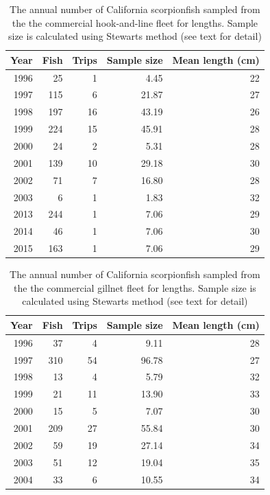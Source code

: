 \documentclass[12pt,]{article}
\begin{document}
\FloatBarrier

\vspace{2in}

\begin{table}[ht]
\centering
\caption{The annual number of California scorpionfish 
                                              sampled from the the commercial hook-and-line 
                                            fleet for lengths. Sample size is calculated 
                                            using Stewarts method (see text for detail)} 
\label{tab:ComHL_lengthsample}
\begin{tabular}{rrrrr}
  \hline
Year & Fish & Trips & Sample size & Mean length (cm) \\ 
  \hline
1996 & 25 & 1 & 4.45 & 22 \\ 
  1997 & 115 & 6 & 21.87 & 27 \\ 
  1998 & 197 & 16 & 43.19 & 26 \\ 
  1999 & 224 & 15 & 45.91 & 28 \\ 
  2000 & 24 & 2 & 5.31 & 28 \\ 
  2001 & 139 & 10 & 29.18 & 30 \\ 
  2002 & 71 & 7 & 16.80 & 28 \\ 
  2003 & 6 & 1 & 1.83 & 32 \\ 
  2013 & 244 & 1 & 7.06 & 29 \\ 
  2014 & 46 & 1 & 7.06 & 30 \\ 
  2015 & 163 & 1 & 7.06 & 29 \\ 
   \hline
\end{tabular}
\end{table}\vspace{2in}

\begin{table}[ht]
\centering
\caption{The annual number of California scorpionfish 
                                              sampled from the the commercial gillnet 
                                            fleet for lengths. Sample size is calculated 
                                            using Stewarts method (see text for detail)} 
\label{tab:ComNet_lengthsample}
\begin{tabular}{rrrrr}
  \hline
Year & Fish & Trips & Sample size & Mean length (cm) \\ 
  \hline
1996 & 37 & 4 & 9.11 & 28 \\ 
  1997 & 310 & 54 & 96.78 & 27 \\ 
  1998 & 13 & 4 & 5.79 & 32 \\ 
  1999 & 21 & 11 & 13.90 & 33 \\ 
  2000 & 15 & 5 & 7.07 & 30 \\ 
  2001 & 209 & 27 & 55.84 & 30 \\ 
  2002 & 59 & 19 & 27.14 & 34 \\ 
  2003 & 51 & 12 & 19.04 & 35 \\ 
  2004 & 33 & 6 & 10.55 & 34 \\ 
   \hline
\end{tabular}
\end{table}\vspace{2in}
\end{document}
